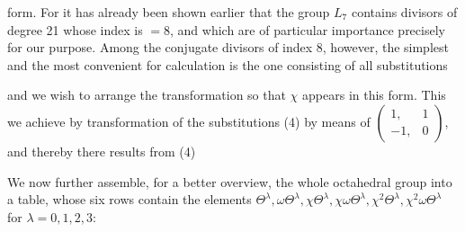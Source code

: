 
form. For it has already been shown earlier that the group $L_7$ contains divisors of degree 21 whose index is $= 8$, and which are of particular importance precisely for our purpose. Among the conjugate divisors of index 8, however, the simplest and the most convenient for calculation is the one consisting of all substitutions


and we wish to arrange the transformation so that $\chi$ appears in this form. This we achieve by transformation of the substitutions (4) by means of $\begin{pmatrix} 1, & 1 \\ -1, & 0 \end{pmatrix}$, and thereby there results from (4)


We now further assemble, for a better overview, the whole octahedral group into a table, whose six rows contain the elements $\Theta^\lambda, \omega\Theta^\lambda, \chi\Theta^\lambda, \chi\omega\Theta^\lambda, \chi^2\Theta^\lambda, \chi^2\omega\Theta^\lambda$ for $\lambda = 0, 1, 2, 3$:

